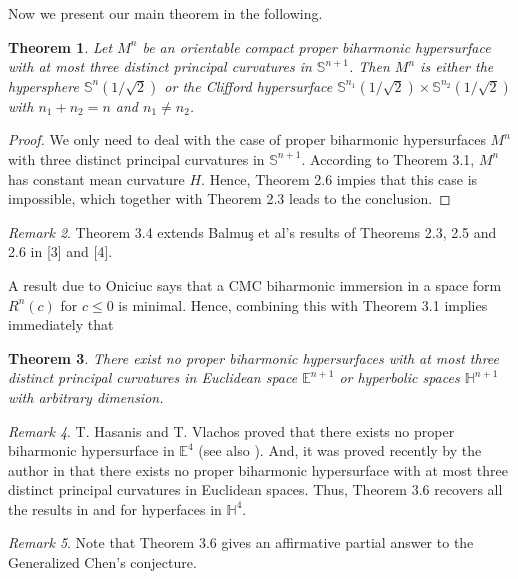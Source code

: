 \documentclass[twoside,reqno,A4]{amsart}
\newtheorem{theorem}{Theorem}[section]
\theoremstyle{definition}
\theoremstyle{remark}
\newtheorem{remark}[theorem]{Remark}
\numberwithin{equation}{section}
\begin{document}
Now we present our main theorem in the following.
\begin{theorem}
Let $M^n$ be an orientable compact proper biharmonic hypersurface
with at most three distinct principal curvatures in $\mathbb
S^{n+1}$. Then $M^n$ is either the hypersphere $\mathbb
S^n(1/\sqrt2)$ or the Clifford hypersurface $\mathbb
S^{n_1}(1/\sqrt2)\times\mathbb S^{n_2}(1/\sqrt2)$ with $n_1+n_2=n$
and $n_1\neq n_2$.
\end{theorem}
\begin{proof}
We only need to deal with the case of proper biharmonic
hypersurfaces $M^n$ with three distinct principal curvatures in
$\mathbb S^{n+1}$. According to Theorem 3.1, $M^n$ has constant mean
curvature $H$. Hence, Theorem 2.6 impies that this case is
impossible, which together with Theorem 2.3 leads to the conclusion.
\end{proof}
\begin{remark}
Theorem 3.4 extends Balmu\c{s} et al's results of Theorems 2.3, 2.5
and 2.6 in [3] and [4].
\end{remark}
A result due to Oniciuc \cite{oniciuc2002} says that a CMC
biharmonic immersion in a space form $R^n(c)$ for $c\leq0$ is
minimal. Hence, combining this with Theorem 3.1 implies immediately
that
\begin{theorem}
There exist no proper biharmonic hypersurfaces with at most three
distinct principal curvatures in Euclidean space $\mathbb E^{n+1}$
or hyperbolic spaces $\mathbb H^{n+1}$ with arbitrary dimension.
\end{theorem}
\begin{remark}
T. Hasanis and T. Vlachos \cite{HasanisVlachos1995} proved that
there exists no proper biharmonic hypersurface in $\mathbb E^4$ (see
also \cite{defever1998}). And, it was proved recently by the author
in \cite{fu} that there exists no proper biharmonic hypersurface
with at most three distinct principal curvatures in Euclidean
spaces. Thus, Theorem 3.6 recovers all the results in
\cite{HasanisVlachos1995, defever1998, fu} and \cite{BMO20102} for
hyperfaces in $\mathbb H^4$.
\end{remark}
\begin{remark}
Note that Theorem 3.6 gives an affirmative partial answer to the
Generalized Chen's conjecture.
\end{remark}
\end{document}
